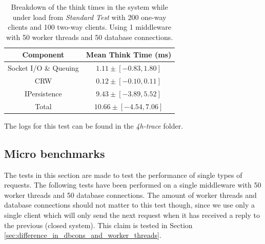 \documentclass{article}
\begin{document}
            \begin{table}[H]
                \centering
                \begin{tabular}{|c|c|}
                   \hline 
                    \textbf{Component} & \textbf{Mean Think Time} (ms) \\ 
                        \hline 
                        Socket I/O \& Queuing & $1.11 \pm [-0.83 , 1.80]$\\ 
                        \hline 
                        CRW & $0.12 \pm [-0.10 , 0.11]$ \\ 
                        \hline 
                        IPersistence & $9.43 \pm [-3.89 , 5.52]$\\ 
                        \hline 
                        Total & $10.66 \pm [-4.54 , 7.06]$\\ 
                        \hline 
                    \end{tabular}
                    \caption{Breakdown of the think times in the system while under load from \textit{Standard Test} with 200 one-way clients and 100 two-way clients. Using 1 middleware with 50 worker threads and 50 database connections.}
                    \label{table:thinktimes_4h_test_components}
                \end{table} 
        The logs for this test can be found in the \textit{4h-trace} folder.


        \subsection{Micro benchmarks}
            The tests in this section are made to test the performance of single types of requests. The following tests have been performed on a single middleware with 50 worker threads and 50 database connections. The amount of worker threads and database connections should not matter to this test though, since we use only a single client which will only send the next request when it has received a reply to the previous (closed system). This claim is tested in Section \ref{sec:difference_in_dbcons_and_worker_threads}.
\end{document}
